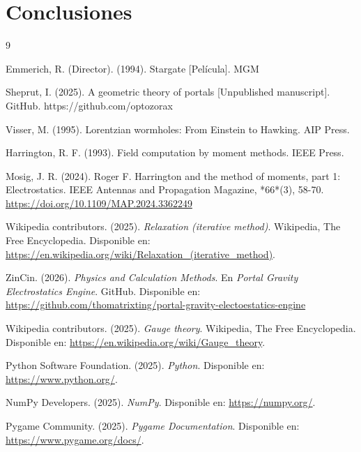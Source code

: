 \documentclass[12pt, twocolumn]{article}
\begin{document}
\section{Conclusiones}

\begin{thebibliography}{9}

Emmerich, R. (Director). (1994). Stargate [Película]. MGM

Sheprut, I. (2025). A geometric theory of portals [Unpublished manuscript]. GitHub. https://github.com/optozorax

Visser, M. (1995). Lorentzian wormholes: From Einstein to Hawking. AIP Press.

Harrington, R. F. (1993). Field computation by moment methods. IEEE Press.

Mosig, J. R. (2024). Roger F. Harrington and the method of moments, part 1: Electrostatics. IEEE Antennas and Propagation Magazine, *66*(3), 58-70. \url{https://doi.org/10.1109/MAP.2024.3362249}

Wikipedia contributors. (2025). \textit{Relaxation (iterative method)}. Wikipedia, The Free Encyclopedia. Disponible en: \url{https://en.wikipedia.org/wiki/Relaxation_(iterative_method)}.

ZinCin. (2026). \textit{Physics and Calculation Methods}. En \textit{Portal Gravity Electrostatics Engine}. GitHub. Disponible en: \url{https://github.com/thomatrixting/portal-gravity-electoestatics-engine}

Wikipedia contributors. (2025). \textit{Gauge theory}. Wikipedia, The Free Encyclopedia. Disponible en: \url{https://en.wikipedia.org/wiki/Gauge_theory}.

Python Software Foundation. (2025). \textit{Python}. Disponible en: \url{https://www.python.org/}.

NumPy Developers. (2025). \textit{NumPy}. Disponible en: \url{https://numpy.org/}.

Pygame Community. (2025). \textit{Pygame Documentation}. Disponible en: \url{https://www.pygame.org/docs/}.

\end{thebibliography}



\newpage
\end{document}
